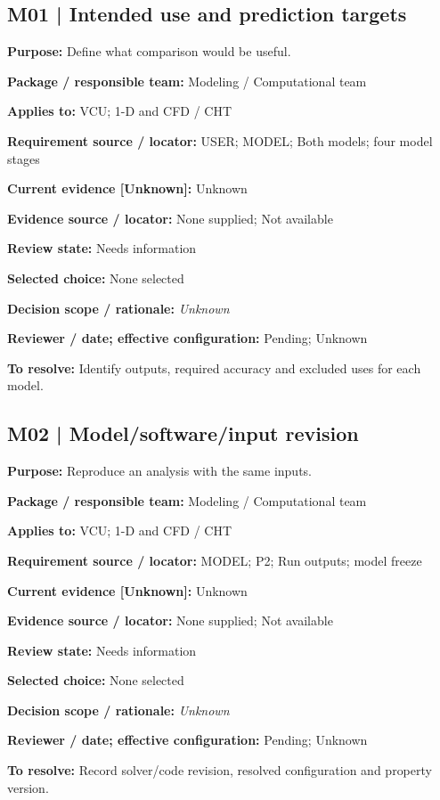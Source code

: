 \documentclass[11pt]{article}
\begin{document}
\begin{minipage}{\textwidth}\small\setlength{\parskip}{2pt}
\subsection*{M01 | Intended use and prediction targets}
\textbf{Purpose:} Define what comparison would be useful.\par
\textbf{Package / responsible team:} Modeling / Computational team\par
\textbf{Applies to:} VCU; 1-D and CFD / CHT\par
\textbf{Requirement source / locator:} USER; MODEL; Both models; four model stages\par
\textbf{Current evidence [Unknown]:} Unknown\par
\textbf{Evidence source / locator:} None supplied; Not available\par
\textbf{Review state:} Needs information\par
\textbf{Selected choice:} None selected\par
\textbf{Decision scope / rationale:} \textit{Unknown}\par
\textbf{Reviewer / date; effective configuration:} Pending; Unknown\par
\textbf{To resolve:} Identify outputs, required accuracy and excluded uses for each model.\par
\end{minipage}\par\vspace{5pt}
\begin{minipage}{\textwidth}\small\setlength{\parskip}{2pt}
\subsection*{M02 | Model/software/input revision}
\textbf{Purpose:} Reproduce an analysis with the same inputs.\par
\textbf{Package / responsible team:} Modeling / Computational team\par
\textbf{Applies to:} VCU; 1-D and CFD / CHT\par
\textbf{Requirement source / locator:} MODEL; P2; Run outputs; model freeze\par
\textbf{Current evidence [Unknown]:} Unknown\par
\textbf{Evidence source / locator:} None supplied; Not available\par
\textbf{Review state:} Needs information\par
\textbf{Selected choice:} None selected\par
\textbf{Decision scope / rationale:} \textit{Unknown}\par
\textbf{Reviewer / date; effective configuration:} Pending; Unknown\par
\textbf{To resolve:} Record solver/code revision, resolved configuration and property version.\par
\end{minipage}\par\vspace{5pt}
\end{document}
